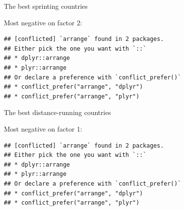 \documentclass[ignorenonframetext,]{beamer}
\newenvironment{Shaded}{\begin{snugshade}}{\end{snugshade}}
\newcommand{\DataTypeTok}[1]{\textcolor[rgb]{0.13,0.29,0.53}{#1}}
\newcommand{\DecValTok}[1]{\textcolor[rgb]{0.00,0.00,0.81}{#1}}
\newcommand{\KeywordTok}[1]{\textcolor[rgb]{0.13,0.29,0.53}{\textbf{#1}}}
\newcommand{\NormalTok}[1]{#1}
\newcommand{\OperatorTok}[1]{\textcolor[rgb]{0.81,0.36,0.00}{\textbf{#1}}}
\newcommand{\StringTok}[1]{\textcolor[rgb]{0.31,0.60,0.02}{#1}}
\begin{document}
\begin{frame}[fragile]{The best sprinting countries}
\protect\hypertarget{the-best-sprinting-countries}{}

Most negative on factor 2:

\begin{Shaded}
\end{Shaded}

\begin{verbatim}
## [conflicted] `arrange` found in 2 packages.
## Either pick the one you want with `::` 
## * dplyr::arrange
## * plyr::arrange
## Or declare a preference with `conflict_prefer()`
## * conflict_prefer("arrange", "dplyr")
## * conflict_prefer("arrange", "plyr")
\end{verbatim}

\end{frame}

\begin{frame}[fragile]{The best distance-running countries}
\protect\hypertarget{the-best-distance-running-countries}{}

Most negative on factor 1:

\begin{Shaded}
\end{Shaded}

\begin{verbatim}
## [conflicted] `arrange` found in 2 packages.
## Either pick the one you want with `::` 
## * dplyr::arrange
## * plyr::arrange
## Or declare a preference with `conflict_prefer()`
## * conflict_prefer("arrange", "dplyr")
## * conflict_prefer("arrange", "plyr")
\end{verbatim}

\end{frame}
\end{document}
